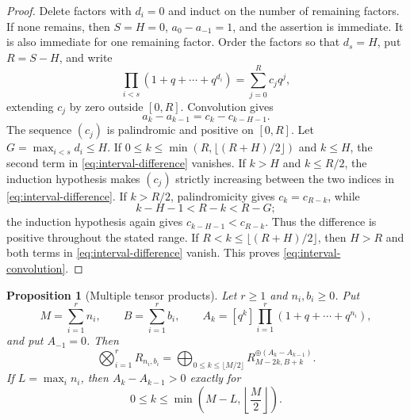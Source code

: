 \documentclass[11pt,reqno]{amsart}
\newtheorem{proposition}[theorem]{Proposition}
\theoremstyle{definition}
\theoremstyle{remark}
\begin{document}
\begin{proof}
Delete factors with $d_i=0$ and induct on the number of remaining factors.
If none remains, then $S=H=0$, $a_0-a_{-1}=1$, and the assertion is
immediate.  It is also immediate for one remaining factor.  Order the
factors so that
$d_s=H$, put $R=S-H$, and write
\begin{equation*}
 \prod_{i<s}(1+q+\cdots+q^{d_i})=\sum_{j=0}^{R}c_jq^j,
\end{equation*}
extending $c_j$ by zero outside $[0,R]$.  Convolution gives
\begin{equation}\label{eq:interval-difference}
 a_k-a_{k-1}=c_k-c_{k-H-1}.
\end{equation}
The sequence $(c_j)$ is palindromic and positive on $[0,R]$.  Let
$G=\max_{i<s}d_i\leq H$.  If
$0\leq k\leq\min(R,\lfloor(R+H)/2\rfloor)$ and $k\leq H$, the second term
in \eqref{eq:interval-difference} vanishes.  If $k>H$ and $k\leq R/2$, the
induction hypothesis makes $(c_j)$ strictly increasing between the two
indices in \eqref{eq:interval-difference}.  If $k>R/2$, palindromicity gives
$c_k=c_{R-k}$, while
\begin{equation*}
 k-H-1<R-k<R-G;
\end{equation*}
the induction hypothesis again gives $c_{k-H-1}<c_{R-k}$.  Thus the
difference is positive throughout the stated range.  If
$R<k\leq\lfloor(R+H)/2\rfloor$, then $H>R$ and both terms in
\eqref{eq:interval-difference} vanish.  This proves
\eqref{eq:interval-convolution}.
\end{proof}

\begin{proposition}[Multiple tensor products]\label{prop:multiple-tensor}
Let $r\geq1$ and $n_i,b_i\geq0$.  Put
\begin{equation*}
 M=\sum_{i=1}^{r}n_i,
 \qquad B=\sum_{i=1}^{r}b_i,
 \qquad
 A_k=[q^k]\prod_{i=1}^{r}(1+q+\cdots+q^{n_i}),
\end{equation*}
and put $A_{-1}=0$.  Then
\begin{equation}\label{eq:multiple-tensor}
 \bigotimes_{i=1}^{r}R_{n_i,b_i}
 =
 \bigoplus_{0\leq k\leq\lfloor M/2\rfloor}
 R_{M-2k,B+k}^{\oplus(A_k-A_{k-1})}.
\end{equation}
If $L=\max_i n_i$, then $A_k-A_{k-1}>0$ exactly for
\begin{equation}\label{eq:tensor-support}
 0\leq k\leq
 \min\left(M-L,\left\lfloor\frac M2\right\rfloor\right).
\end{equation}
\end{proposition}
\end{document}
